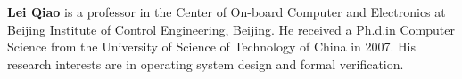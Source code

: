 \documentclass[twoside]{article}
\begin{document}
\begin{multicols}{2}
\noindent\parbox{8.3cm}
{
{\small\quad 
  {\bf Lei Qiao}  
  is a professor in the Center of On-board Computer 
  and Electronics at Beijing Institute of Control Engineering, Beijing. 
  He received a Ph.d.in Computer Science from 
  the University of Science of Technology of China in 2007. 
  His research interests are in operating system design 
  and formal verification.
}\\[1mm]}

\label{last-page}
\end{multicols}
\label{last-page}
\end{document}
